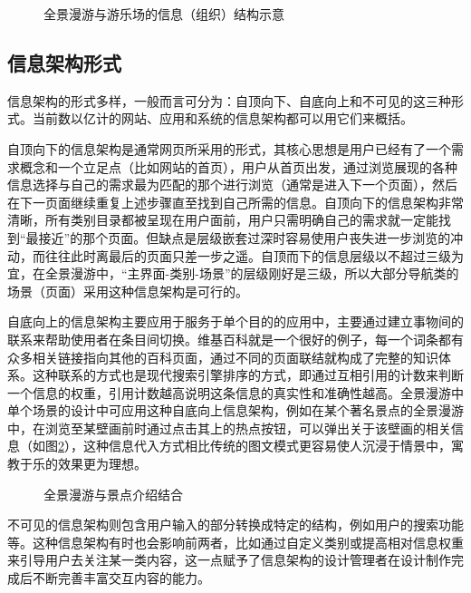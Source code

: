 \begin{figure}[htp]
\centering
{}
\caption{全景漫游与游乐场的信息（组织）结构示意}
\label{fig:park}
\end{figure}

\subsection{信息架构形式}
信息架构的形式多样，一般而言可分为：自顶向下、自底向上和不可见的这三种形式。当前数以亿计的网站、应用和系统的信息架构都可以用它们来概括。

自顶向下的信息架构是通常网页所采用的形式，其核心思想是用户已经有了一个需求概念和一个立足点（比如网站的首页），用户从首页出发，通过浏览展现的各种信息选择与自己的需求最为匹配的那个进行浏览（通常是进入下一个页面），然后在下一页面继续重复上述步骤直至找到自己所需的信息。自顶向下的信息架构非常清晰，所有类别目录都被呈现在用户面前，用户只需明确自己的需求就一定能找到“最接近”的那个页面。但缺点是层级嵌套过深时容易使用户丧失进一步浏览的冲动，而往往此时离最后的页面只差一步之遥。自顶而下的信息层级以不超过三级为宜，在全景漫游中，“主界面-类别-场景”的层级刚好是三级，所以大部分导航类的场景（页面）采用这种信息架构是可行的。

自底向上的信息架构主要应用于服务于单个目的的应用中，主要通过建立事物间的联系来帮助使用者在条目间切换。维基百科就是一个很好的例子，每一个词条都有众多相关链接指向其他的百科页面，通过不同的页面联结就构成了完整的知识体系。这种联系的方式也是现代搜索引擎排序的方式，即通过互相引用的计数来判断一个信息的权重，引用计数越高说明这条信息的真实性和准确性越高。全景漫游中单个场景的设计中可应用这种自底向上信息架构，例如在某个著名景点的全景漫游中，在浏览至某壁画前时通过点击其上的热点按钮，可以弹出关于该壁画的相关信息（如图\ref{fig:dunhuang}），这种信息代入方式相比传统的图文模式更容易使人沉浸于情景中，寓教于乐的效果更为理想。

\begin{figure}[htp]
\centering
{}
\caption{全景漫游与景点介绍结合}
\label{fig:dunhuang}
\end{figure}

不可见的信息架构则包含用户输入的部分转换成特定的结构，例如用户的搜索功能等。这种信息架构有时也会影响前两者，比如通过自定义类别或提高相对信息权重来引导用户去关注某一类内容，这一点赋予了信息架构的设计管理者在设计制作完成后不断完善丰富交互内容的能力。

